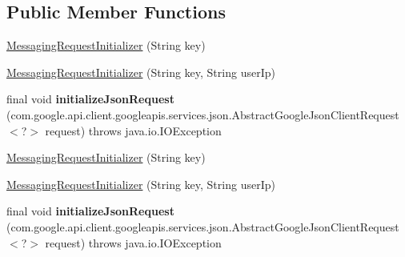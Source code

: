 \subsection*{Public Member Functions}
\begin{DoxyCompactItemize}
\item 
\hyperlink{classcom_1_1example_1_1lusifer_1_1myapplication_1_1backend_1_1messaging_1_1_messaging_request_initializer_ad7db0db950cd64697d07c47a5f17367e}{Messaging\+Request\+Initializer} (String key)
\item 
\hyperlink{classcom_1_1example_1_1lusifer_1_1myapplication_1_1backend_1_1messaging_1_1_messaging_request_initializer_a6d7b24f5969de628fed4fbb73fc64d92}{Messaging\+Request\+Initializer} (String key, String user\+Ip)
\item 
\hypertarget{classcom_1_1example_1_1lusifer_1_1myapplication_1_1backend_1_1messaging_1_1_messaging_request_initializer_aded39367cdfa4465fc73237d85f267fb}{}final void {\bfseries initialize\+Json\+Request} (com.\+google.\+api.\+client.\+googleapis.\+services.\+json.\+Abstract\+Google\+Json\+Client\+Request$<$?$>$ request)  throws java.\+io.\+I\+O\+Exception \label{classcom_1_1example_1_1lusifer_1_1myapplication_1_1backend_1_1messaging_1_1_messaging_request_initializer_aded39367cdfa4465fc73237d85f267fb}

\item 
\hyperlink{classcom_1_1example_1_1lusifer_1_1myapplication_1_1backend_1_1messaging_1_1_messaging_request_initializer_ad7db0db950cd64697d07c47a5f17367e}{Messaging\+Request\+Initializer} (String key)
\item 
\hyperlink{classcom_1_1example_1_1lusifer_1_1myapplication_1_1backend_1_1messaging_1_1_messaging_request_initializer_a6d7b24f5969de628fed4fbb73fc64d92}{Messaging\+Request\+Initializer} (String key, String user\+Ip)
\item 
\hypertarget{classcom_1_1example_1_1lusifer_1_1myapplication_1_1backend_1_1messaging_1_1_messaging_request_initializer_aded39367cdfa4465fc73237d85f267fb}{}final void {\bfseries initialize\+Json\+Request} (com.\+google.\+api.\+client.\+googleapis.\+services.\+json.\+Abstract\+Google\+Json\+Client\+Request$<$?$>$ request)  throws java.\+io.\+I\+O\+Exception \label{classcom_1_1example_1_1lusifer_1_1myapplication_1_1backend_1_1messaging_1_1_messaging_request_initializer_aded39367cdfa4465fc73237d85f267fb}

\end{DoxyCompactItemize}
